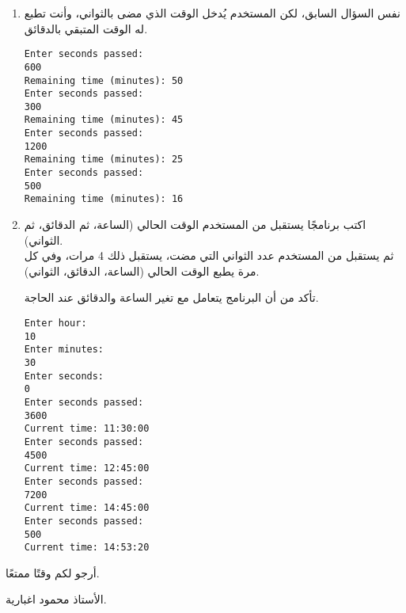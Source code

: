 \documentclass[12pt]{article}
\begin{document}
\begin{enumerate}
\clearpage
\item
نفس السؤال السابق، لكن المستخدم يُدخل الوقت الذي مضى بالثواني، وأنت تطبع له الوقت المتبقي بالدقائق. \\
\begin{example}
\begin{english}
\begin{lstlisting}
Enter seconds passed:
600
Remaining time (minutes): 50
Enter seconds passed:
300
Remaining time (minutes): 45
Enter seconds passed:
1200
Remaining time (minutes): 25
Enter seconds passed:
500
Remaining time (minutes): 16
\end{lstlisting}
\end{english}
\end{example}

\clearpage
\item
اكتب برنامجًا يستقبل من المستخدم الوقت الحالي (الساعة، ثم الدقائق، ثم الثواني). \\
ثم يستقبل من المستخدم عدد الثواني التي مضت، يستقبل ذلك 4 مرات، وفي كل مرة يطبع الوقت الحالي (الساعة، الدقائق، الثواني). \\
\begin{note}
تأكد من أن البرنامج يتعامل مع تغير الساعة والدقائق عند الحاجة.
\end{note}
\begin{example}
\begin{english}
\begin{lstlisting}
Enter hour:
10
Enter minutes:
30
Enter seconds:
0
Enter seconds passed:
3600
Current time: 11:30:00
Enter seconds passed:
4500
Current time: 12:45:00
Enter seconds passed:
7200
Current time: 14:45:00
Enter seconds passed:
500
Current time: 14:53:20
\end{lstlisting}
\end{english}
\end{example}

\end{enumerate}

\vspace{3cm}
\begin{flushleft}
أرجو لكم وقتًا ممتعًا.

الأستاذ محمود اغبارية.
\end{flushleft}
\end{document}
